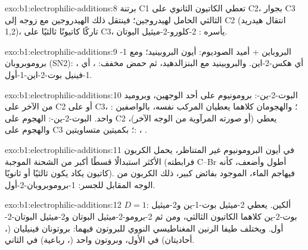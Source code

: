 \begin{solution}{exo:b1:electrophilic-additions:8}
برتنة C1 تعطي الكاتيون الثانوي على C2، بجوار C3 الثالثي
الحامل لهيدروجين؛ فينتقل ذلك الهيدروجين مع زوجه إلى C2 (انتقال
هيدريد 1,2)، تاركًا كاتيونًا ثالثيًا على C3، يأسره
: 2-كلورو-2-ميثيل البوتان.
\end{solution}

\begin{solution}{exo:b1:electrophilic-additions:9}
البروباين + أميد الصوديوم: أيون البروبينيد؛ ومع 1-بروموبروبان (SN2):
، أي هكس-2-اين. والبروبينيد مع البنزالدهيد، ثم حمض
مخفف: ، أي 1-فينيل بوت-2-اين-1-أول.
\end{solution}

\begin{solution}{exo:b1:electrophilic-additions:10}
البوت-2-ين-: برومونيوم على أحد الوجهين، وبروميد من الآخر على C2
أو على C3؛ والهجومان كلاهما يعطيان المركب نفسه، بالواصفين :
،  واحد. البوت-2-ين-: الهجوم على C2 يعطي
 (أو صورته المرآوية من الوجه الآخر)، والهجوم على C3
؛ بكميتين متساويتين: ، .
\end{solution}

\begin{solution}{exo:b1:electrophilic-additions:11}
في أيون البرومونيوم غير المتناظر، يحمل الكربون الأكثر استبدالًا قسطًا أكبر
من الشحنة الموجبة (فرابطته C--Br أطول وأضعف، كأنه كاتيون يكاد يكون
ثالثيًا أو ثانويًا). فيهاجم الماء، الموجود بفائض كبير، ذلك الكربون
من الوجه المقابل للجسر: 1-بروموبروبان-2-أول.
\end{solution}

\begin{solution}{exo:b1:electrophilic-additions:12}
$D = 1$: ألكين. يعطي 2-ميثيل بوت-1-ين و2-ميثيل بوت-2-ين كلاهما
الكاتيون الثالثي، ومن ثم 2-برومو-2-ميثيل البوتان و2-ميثيل البوتان-2-أول.
ويختلف طيفا الرنين المغناطيسي النووي للبروتون فيهما: بروتونان فينيليان (، أحاديتان) في
الأول، وبروتون واحد (، رباعية) في الثاني.
\end{solution}

